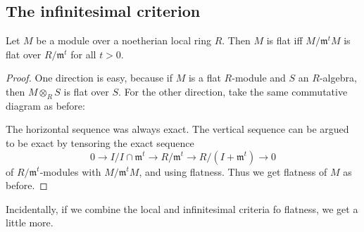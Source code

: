 \subsection{The infinitesimal criterion}

\begin{theorem} Let $M$ be a module over a noetherian local ring $R$.  Then $M$ is flat iff $M/\mathfrak{m}^tM$ is flat over $R/\mathfrak{m}^t$ for all $t>0$.
\end{theorem}
\begin{proof} 
One direction is easy, because if $M$ is a flat $R$-module and $S$ an $R$-algebra, then $M \otimes_R S$ is flat over $S$. 
For the other direction, take the same commutative diagram as before:\\

The horizontal sequence was always exact.  The vertical sequence can be argued to be exact by tensoring the exact sequence 
\[ 0 \to  I/I  \cap \mathfrak{m}^t \to R/\mathfrak{m}^t \to R/(I+\mathfrak{m}^t) \to 0\]
of $R/\mathfrak{m}^t$-modules with $M/\mathfrak{m}^tM$, and using flatness.
Thus we get flatness of $M$ as before.

\end{proof} 
Incidentally, if we combine the local and infinitesimal criteria fo flatness, we get a little more.

